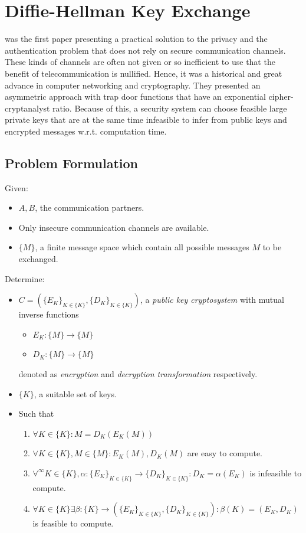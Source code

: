 \documentclass[paper=a4, fontsize=11pt]{scrartcl} %
\numberwithin{equation}{section} %
\numberwithin{figure}{section} %
\numberwithin{table}{section} %
\begin{document}
\section{Diffie-Hellman Key Exchange}
\label{sec:DHKeyExchange}
\citep{diffie1976new} was the first paper presenting a practical solution to the privacy and the authentication problem that does not rely on secure communication channels. These kinds of channels are often not given or so inefficient to use that the benefit of telecommunication is nullified. Hence, it was a historical and great advance in computer networking and cryptography. They presented an asymmetric approach with trap door functions that have an exponential cipher-cryptanalyst ratio. Because of this, a security system can choose feasible large private keys that are at the same time infeasible to infer from public keys and encrypted messages w.r.t. computation time.
\subsection{Problem Formulation}
Given:
\begin{itemize}
	\item $A, B$, the communication partners.
	\item Only insecure communication channels are available.
	\item $\{M\}$, a finite message space which contain all possible messages $M$ to be exchanged.
\end{itemize}
Determine:
\begin{itemize}
	\item $C = (\{E_K\}_{K\in\{K\}}, \{D_K\}_{K\in\{K\}})$, a \textit{public key cryptosystem} with mutual inverse functions
	\begin{itemize}
		\item $E_K:\{M\}\rightarrow\{M\}$
		\item $D_K:\{M\}\rightarrow\{M\}$
	\end{itemize}
	denoted as \textit{encryption} and \textit{decryption transformation} respectively.
	\item $\{K\}$, a suitable set of keys.
	\item Such that
	\begin{enumerate}
	\item $\forall K\in\{K\}:M = D_K(E_K(M))$
	\item $\forall K\in\{K\},M\in\{M\}:E_K(M), D_K(M)$ are easy to compute.
	\item $\forall^\infty K\in\{K\},\alpha:\{E_K\}_{K\in\{K\}}\rightarrow \{D_K\}_{K\in\{K\}}:D_K = \alpha(E_K)$ is infeasible to compute.
	\item $\forall K\in\{K\}\exists\beta:\{K\}\rightarrow(\{E_K\}_{K\in\{K\}}, \{D_K\}_{K\in\{K\}}):\beta(K) = (E_K,D_K)$ is feasible to compute.
	\end{enumerate}
\end{itemize}
\end{document}
